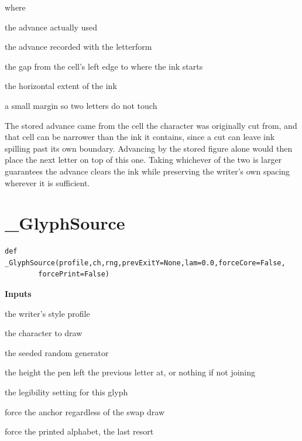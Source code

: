 \noindent where
\begin{description}[leftmargin=2.4em,style=nextline,font=\normalfont\ttfamily]\setlength\itemsep{1pt}
  \item[{$\mathrm{adv}$}] \normalfont the advance actually used
  \item[{$\mathrm{adv}_{\mathrm{stored}}$}] \normalfont the advance recorded with the letterform
  \item[{$\mathrm{lead}$}] \normalfont the gap from the cell's left edge to where the ink starts
  \item[{$\mathrm{width}$}] \normalfont the horizontal extent of the ink
  \item[{$0.04$}] \normalfont a small margin so two letters do not touch
\end{description}
The stored advance came from the cell the character was originally cut from, and that cell can be narrower than the ink it contains, since a cut can leave ink spilling past its own boundary. Advancing by the stored figure alone would then place the next letter on top of this one. Taking whichever of the two is larger guarantees the advance clears the ink while preserving the writer's own spacing wherever it is sufficient.


\section{\_GlyphSource}
\begin{lstlisting}[style=sig]
def _GlyphSource(profile,ch,rng,prevExitY=None,lam=0.0,forceCore=False,
        forcePrint=False)
\end{lstlisting}

\noindent\textbf{Inputs}
\begin{description}[leftmargin=2.2em,style=nextline,font=\normalfont\ttfamily]\setlength\itemsep{1pt}
  \item[{profile}] \normalfont the writer's style profile
  \item[{ch}] \normalfont the character to draw
  \item[{rng}] \normalfont the seeded random generator
  \item[{prevExitY}] \normalfont the height the pen left the previous letter at, or nothing if not joining
  \item[{lam}] \normalfont the legibility setting for this glyph
  \item[{forceCore}] \normalfont force the anchor regardless of the swap draw
  \item[{forcePrint}] \normalfont force the printed alphabet, the last resort
\end{description}

